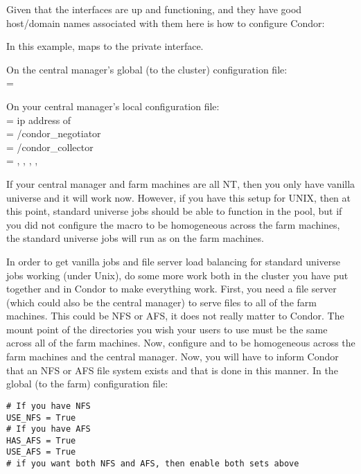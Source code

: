 Given that the interfaces are up and functioning, and they have good
host/domain names associated with them here is how to configure Condor:

In this example,  maps to the private interface.

On the central manager's global (to the cluster) configuration file: \\
 = 

On your central manager's local configuration file: \\
 = ip address of  \\
 = /condor\_negotiator \\
 = /condor\_collector \\
 = , , , , 

If your central manager and farm machines are all NT, then you only have
vanilla universe and it will work now.  However, if you have this setup
for UNIX, then at this point, standard universe jobs should be able to
function in the pool, but if you did not configure the 
macro to be homogeneous across the farm machines, the standard universe
jobs will run as  on the farm machines.

In order to get vanilla jobs and file server load balancing for standard
universe jobs working (under Unix), do some more work both in
the cluster you have put together and in Condor to make everything work.
First, you need a file server (which could also be the central manager) to
serve files to all of the farm machines. This could be NFS or AFS, it does
not really matter to Condor. The mount point of the directories you wish
your users to use must be the same across all of the farm machines. Now,
configure  and  to be
homogeneous across the farm machines and the central manager. Now, you
will have to inform Condor that an NFS or AFS file system exists and that
is done in this manner. In the global (to the farm) configuration file:

\begin{verbatim}
# If you have NFS
USE_NFS = True
# If you have AFS
HAS_AFS = True
USE_AFS = True
# if you want both NFS and AFS, then enable both sets above
\end{verbatim}

